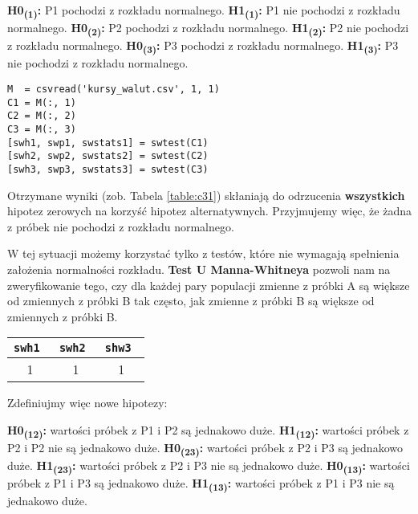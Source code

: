 \documentclass[12pt, a4paper]{article}
\begin{document}
\textbf{H0\textsubscript{(1)}:} P1 pochodzi z rozkładu normalnego. \newline
\textbf{H1\textsubscript{(1)}:} P1 nie pochodzi z rozkładu normalnego. \newline
\textbf{H0\textsubscript{(2)}:} P2 pochodzi z rozkładu normalnego. \newline
\textbf{H1\textsubscript{(2)}:} P2 nie pochodzi z rozkładu normalnego. \newline
\textbf{H0\textsubscript{(3)}:} P3 pochodzi z rozkładu normalnego. \newline
\textbf{H1\textsubscript{(3)}:} P3 nie pochodzi z rozkładu normalnego. \newline

\begin{lstlisting}[frame=single,label={listing:c31},caption={badanie, czy próbki pochodzą z rozkładu normalnego.},captionpos=b]
M  = csvread('kursy_walut.csv', 1, 1)
C1 = M(:, 1) 
C2 = M(:, 2) 
C3 = M(:, 3)
[swh1, swp1, swstats1] = swtest(C1)
[swh2, swp2, swstats2] = swtest(C2)
[swh3, swp3, swstats3] = swtest(C3)
\end{lstlisting}

Otrzymane wyniki (zob. Tabela \ref{table:c31}) skłaniają do odrzucenia \textbf{wszystkich} hipotez zerowych na korzyść hipotez alternatywnych. Przyjmujemy więc, że żadna z próbek nie pochodzi z rozkładu normalnego.

W tej sytuacji możemy korzystać tylko z testów, które nie wymagają spełnienia założenia normalności rozkładu. \textbf{Test U Manna-Whitneya} pozwoli nam na zweryfikowanie tego, czy dla każdej pary populacji zmienne z próbki A są większe od zmiennych z próbki B tak często, jak zmienne z próbki B są większe od zmiennych z próbki B.

\begin{center}
  \begin{tabular}{|c|c|c|}\hline
    \tt swh1 & \tt swh2 & \tt shw3 \\\hline
    1 & 1 & 1 \\\hline
  \end{tabular}
  \label{table:c31}
\end{center}

\noindent Zdefiniujmy więc nowe hipotezy:\newline

\noindent
\textbf{H0\textsubscript{(12)}:} wartości próbek z P1 i P2 są jednakowo duże. \newline
\textbf{H1\textsubscript{(12)}:} wartości próbek z P2 i P2 nie są jednakowo duże. \newline
\textbf{H0\textsubscript{(23)}:} wartości próbek z P2 i P3 są jednakowo duże. \newline
\textbf{H1\textsubscript{(23)}:} wartości próbek z P2 i P3 nie są jednakowo duże. \newline
\textbf{H0\textsubscript{(13)}:} wartości próbek z P1 i P3 są jednakowo duże. \newline
\textbf{H1\textsubscript{(13)}:} wartości próbek z P1 i P3 nie są jednakowo duże. \newline
\end{document}
